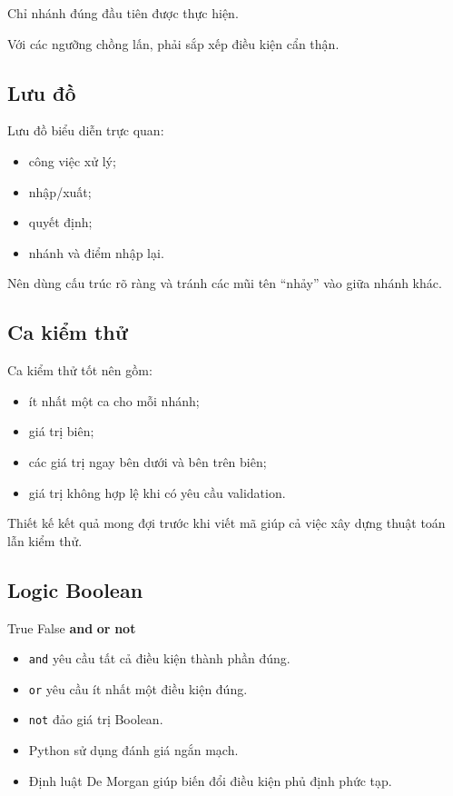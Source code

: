 \documentclass[
  11pt,
  a4paper,
]{article}
\newenvironment{Shaded}{}{}
\newcommand{\KeywordTok}[1]{\textcolor[rgb]{0.00,0.44,0.13}{\textbf{#1}}}
\newcommand{\VariableTok}[1]{\textcolor[rgb]{0.10,0.09,0.49}{#1}}
\providecommand{\tightlist}{%
  \setlength{\itemsep}{0pt}\setlength{\parskip}{0pt}}
\begin{document}
Chỉ nhánh đúng đầu tiên được thực hiện.

Với các ngưỡng chồng lấn, phải sắp xếp điều kiện cẩn thận.

\subsection{Lưu đồ}\label{lux1b0u-ux111ux1ed3}

Lưu đồ biểu diễn trực quan:

\begin{itemize}
\tightlist
\item
  công việc xử lý;
\item
  nhập/xuất;
\item
  quyết định;
\item
  nhánh và điểm nhập lại.
\end{itemize}

Nên dùng cấu trúc rõ ràng và tránh các mũi tên ``nhảy'' vào giữa nhánh
khác.

\subsection{Ca kiểm thử}\label{ca-kiux1ec3m-thux1eed}

Ca kiểm thử tốt nên gồm:

\begin{itemize}
\tightlist
\item
  ít nhất một ca cho mỗi nhánh;
\item
  giá trị biên;
\item
  các giá trị ngay bên dưới và bên trên biên;
\item
  giá trị không hợp lệ khi có yêu cầu validation.
\end{itemize}

Thiết kế kết quả mong đợi trước khi viết mã giúp cả việc xây dựng thuật
toán lẫn kiểm thử.

\subsection{Logic Boolean}\label{logic-boolean}

\begin{Shaded}
\begin{Highlighting}[]
\VariableTok{True}
\VariableTok{False}
\KeywordTok{and}
\KeywordTok{or}
\KeywordTok{not}
\end{Highlighting}
\end{Shaded}

\begin{itemize}
\tightlist
\item
  \texttt{and} yêu cầu tất cả điều kiện thành phần đúng.
\item
  \texttt{or} yêu cầu ít nhất một điều kiện đúng.
\item
  \texttt{not} đảo giá trị Boolean.
\item
  Python sử dụng đánh giá ngắn mạch.
\item
  Định luật De Morgan giúp biến đổi điều kiện phủ định phức tạp.
\end{itemize}
\end{document}

